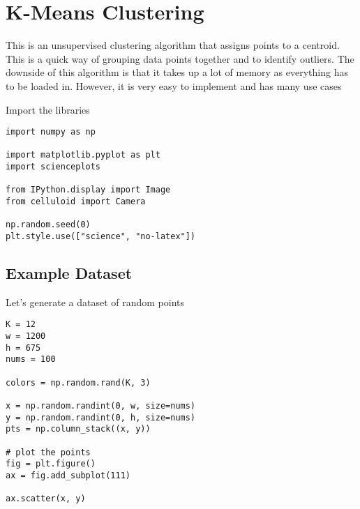 \documentclass[openany]{book}
\begin{document}
    \section{K-Means Clustering}\label{k-means-clustering}

This is an unsupervised clustering algorithm that assigns points to a
centroid. This is a quick way of grouping data points together and to
identify outliers. The downside of this algorithm is that it takes up a
lot of memory as everything has to be loaded in. However, it is very
easy to implement and has many use cases

    Import the libraries

\begin{tcolorbox}
\tiny
\begin{verbatim}
import numpy as np

import matplotlib.pyplot as plt
import scienceplots

from IPython.display import Image
from celluloid import Camera

np.random.seed(0)
plt.style.use(["science", "no-latex"])
\end{verbatim}
\end{tcolorbox}

    \subsection{Example Dataset}\label{example-dataset}

Let's generate a dataset of random points

\begin{tcolorbox}
\tiny
\begin{verbatim}
K = 12
w = 1200
h = 675
nums = 100

colors = np.random.rand(K, 3)

x = np.random.randint(0, w, size=nums)
y = np.random.randint(0, h, size=nums)
pts = np.column_stack((x, y))

# plot the points
fig = plt.figure()
ax = fig.add_subplot(111)

ax.scatter(x, y)
\end{verbatim}
\end{tcolorbox}
        
    \begin{center}
    \end{center}
    { \hspace*{\fill} \\}
    
\end{document}
